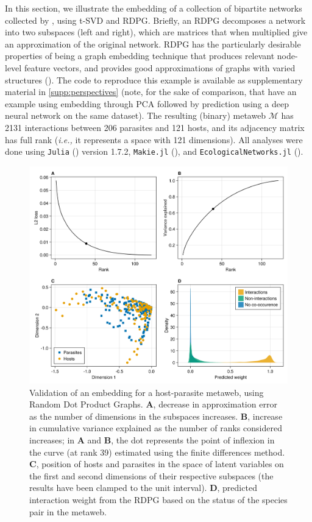 \begin{refsection}
In this section, we illustrate the embedding of a collection of
bipartite networks collected by \cite{Hadfield2014TalTwo}, using t-SVD and RDPG.
Briefly, an RDPG decomposes a network into two subspaces (left and
right), which are matrices that when multiplied give an approximation of
the original network. RDPG has the particularly desirable properties of
being a graph embedding technique that produces relevant node-level
feature vectors, and provides good approximations of graphs with varied
structures (\cite{Athreya2017Statistical}). The code to reproduce this
example is available as supplementary material in \autoref{supp:perspectives} (note, for the sake of
comparison, that \cite{Strydom2021Roadmap} have an example using embedding
through PCA followed by prediction using a deep neural network on the
same dataset). The resulting (binary) metaweb \(\mathcal{M}\) has 2131
interactions between 206 parasites and 121 hosts, and its adjacency
matrix has full rank (\emph{i.e.,} it represents a space with 121
dimensions). All analyses were done using \texttt{Julia} (\cite{Bezanson2017Julia})
version 1.7.2, \texttt{Makie.jl} (\cite{Danisch2021Makie}), and
\texttt{EcologicalNetworks.jl} (\cite{Poisot2019EcoJl}).

\begin{figure}[h]
    \centering
    \includegraphics[width=\textwidth]{figures/illustration-part1.png}
    \caption{Validation of an embedding for a host-parasite metaweb, using
Random Dot Product Graphs. \textbf{A}, decrease in approximation error
as the number of dimensions in the subspaces increases. \textbf{B},
increase in cumulative variance explained as the number of ranks
considered increases; in \textbf{A} and \textbf{B}, the dot represents
the point of inflexion in the curve (at rank 39) estimated using the
finite differences method. \textbf{C}, position of hosts and parasites
in the space of latent variables on the first and second dimensions of
their respective subspaces (the results have been clamped to the unit
interval). \textbf{D}, predicted interaction weight from the RDPG based
on the status of the species pair in the
metaweb.}
    \label{fig:illustration1}
\end{figure}


\end{refsection}

